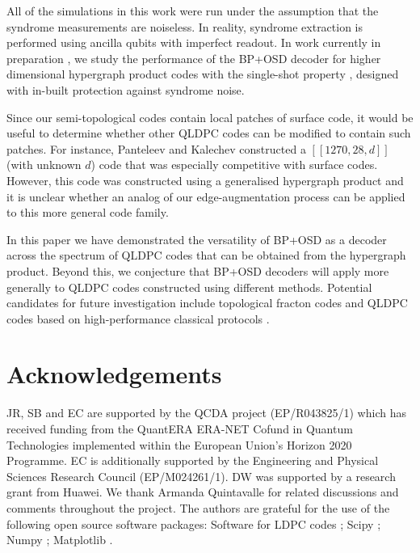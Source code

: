 \documentclass[%
 reprint,
superscriptaddress,
nofootinbib,
 amsmath,amssymb,
secnumarabic
]{revtex4-1}
\newcommand*{\etc}[1]{{#1}}
\begin{document}
All of the simulations in this work were run under the assumption that the syndrome measurements are noiseless. In reality, syndrome extraction is performed using ancilla qubits with imperfect readout. In work currently in preparation \cite{quintavalle2020}, we study the performance of the BP+OSD decoder for higher dimensional hypergraph product codes with the single-shot property \cite{bombin2015single,vasmer2019three,campbell2019theory}, designed with in-built protection against syndrome noise.

\etc{Since our semi-topological codes contain local patches of surface code, it would be useful to determine whether other QLDPC codes can be modified to contain such patches.  For instance,  Panteleev and Kalechev \cite{Panteleev_2019} constructed a $[[1270,28,d]]$ (with unknown $d$) code that was especially competitive with surface codes.  However, this code was constructed using a generalised hypergraph product and it is unclear whether an analog of our edge-augmentation process can be applied to this more general code family.}

In this paper we have demonstrated the versatility of BP+OSD as a decoder across the spectrum of QLDPC codes that can be obtained from the hypergraph product. Beyond this, we conjecture that BP+OSD decoders will apply more generally to QLDPC codes constructed using different methods. Potential candidates for future investigation include topological fracton codes \cite{vijay2016fracton} and QLDPC codes based on high-performance classical protocols \cite{hagiwara2011spatially}. 




\section*{Acknowledgements}

JR, SB and EC are supported by the QCDA project (EP/R043825/1) which has received funding from the QuantERA ERA-NET Cofund in Quantum Technologies implemented within the European Union's Horizon 2020 Programme. EC is additionally supported by the Engineering and Physical Sciences Research Council \etc{(EP/M024261/1). DW was supported by a research grant from Huawei. We thank Armanda Quintavalle for related discussions and comments throughout the project.}  The authors are grateful for the use of the following open source software packages: Software for LDPC codes \cite{radford_neal}; Scipy \cite{scipy}; Numpy \cite{numpy}; Matplotlib \cite{matplotlib}.
\end{document}
